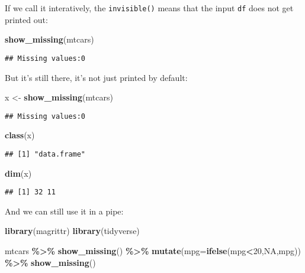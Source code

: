 \documentclass[
]{article}
\newenvironment{Shaded}{\begin{snugshade}}{\end{snugshade}}
\newcommand{\AttributeTok}[1]{\textcolor[rgb]{0.13,0.29,0.53}{#1}}
\newcommand{\ConstantTok}[1]{\textcolor[rgb]{0.56,0.35,0.01}{#1}}
\newcommand{\DecValTok}[1]{\textcolor[rgb]{0.00,0.00,0.81}{#1}}
\newcommand{\FunctionTok}[1]{\textcolor[rgb]{0.13,0.29,0.53}{\textbf{#1}}}
\newcommand{\NormalTok}[1]{#1}
\newcommand{\OtherTok}[1]{\textcolor[rgb]{0.56,0.35,0.01}{#1}}
\newcommand{\SpecialCharTok}[1]{\textcolor[rgb]{0.81,0.36,0.00}{\textbf{#1}}}
\begin{document}
If we call it interatively, the \texttt{invisible()} means that the
input \texttt{df} does not get printed out:

\begin{Shaded}
\begin{Highlighting}[]
\FunctionTok{show\_missing}\NormalTok{(mtcars)}
\end{Highlighting}
\end{Shaded}

\begin{verbatim}
## Missing values:0
\end{verbatim}

But it's still there, it's not just printed by default:

\begin{Shaded}
\begin{Highlighting}[]
\NormalTok{x }\OtherTok{\textless{}{-}} \FunctionTok{show\_missing}\NormalTok{(mtcars)}
\end{Highlighting}
\end{Shaded}

\begin{verbatim}
## Missing values:0
\end{verbatim}

\begin{Shaded}
\begin{Highlighting}[]
\FunctionTok{class}\NormalTok{(x)}
\end{Highlighting}
\end{Shaded}

\begin{verbatim}
## [1] "data.frame"
\end{verbatim}

\begin{Shaded}
\begin{Highlighting}[]
\FunctionTok{dim}\NormalTok{(x)}
\end{Highlighting}
\end{Shaded}

\begin{verbatim}
## [1] 32 11
\end{verbatim}

And we can still use it in a pipe:

\begin{Shaded}
\begin{Highlighting}[]
\FunctionTok{library}\NormalTok{(magrittr)}
\FunctionTok{library}\NormalTok{(tidyverse)}

\NormalTok{mtcars }\SpecialCharTok{\%\textgreater{}\%} 
  \FunctionTok{show\_missing}\NormalTok{() }\SpecialCharTok{\%\textgreater{}\%} 
  \FunctionTok{mutate}\NormalTok{(}\AttributeTok{mpg=}\FunctionTok{ifelse}\NormalTok{(mpg}\SpecialCharTok{\textless{}}\DecValTok{20}\NormalTok{,}\ConstantTok{NA}\NormalTok{,mpg)) }\SpecialCharTok{\%\textgreater{}\%} 
  \FunctionTok{show\_missing}\NormalTok{()}
\end{Highlighting}
\end{Shaded}
\end{document}
